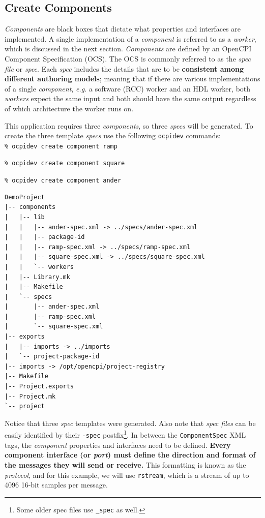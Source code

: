 \subsection{Create Components}
\textit{Components} are black boxes that dictate what properties and interfaces are implemented. A single implementation of a \textit{component} is referred to as a \textit{worker}, which is discussed in the next section. \textit{Components} are defined by an OpenCPI Component Specification (OCS). The OCS is commonly referred to as the \textit{spec file} or \textit{spec}. Each \textit{spec} includes the details that are to be \textbf{consistent among different authoring models}; meaning that if there are various implementations of a single \textit{component}, \textit{e.g.} a software (RCC) worker and an HDL worker, both \textit{workers} expect the same input and both should have the same output regardless of which architecture the worker runs on.\newline

This application requires three \textit{components}, so three \textit{specs} will be generated. To create the three template \textit{specs} use the following \verb+ocpidev+ commands:\\

\forceindent\verb+% ocpidev create component ramp+

\forceindent\verb+% ocpidev create component square+

\forceindent\verb+% ocpidev create component ander+\\
\OcpidevCreate{}

\bstart
\begin{verbatim}
DemoProject
|-- components
|   |-- lib
|   |   |-- ander-spec.xml -> ../specs/ander-spec.xml
|   |   |-- package-id
|   |   |-- ramp-spec.xml -> ../specs/ramp-spec.xml
|   |   |-- square-spec.xml -> ../specs/square-spec.xml
|   |   `-- workers
|   |-- Library.mk
|   |-- Makefile
|   `-- specs
|       |-- ander-spec.xml
|       |-- ramp-spec.xml
|       `-- square-spec.xml
|-- exports
|   |-- imports -> ../imports
|   `-- project-package-id
|-- imports -> /opt/opencpi/project-registry
|-- Makefile
|-- Project.exports
|-- Project.mk
`-- project
\end{verbatim}
\bend
Notice that three \textit{spec} templates were generated. Also note that \textit{spec files} can be easily identified by their \verb+-spec+ postfix\footnote{Some older spec files use \texttt{\_spec} as well.}. In between the \verb+ComponentSpec+ XML tags, the \textit{component} properties and interfaces need to be defined. \textbf{Every component interface (or \textit{port}) must define the direction and format of the messages they will send or receive.} This formatting is known as the \textit{protocol}, and for this example, we will use \texttt{rstream}, which is a stream of up to 4096 16-bit samples per message.

